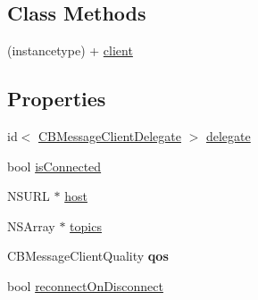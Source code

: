 \subsection*{Class Methods}
\begin{DoxyCompactItemize}
\item 
(instancetype) + \hyperlink{interface_c_b_message_client_acef3f93cc08d62c70a978d81b04d8f6f}{client}
\end{DoxyCompactItemize}
\subsection*{Properties}
\begin{DoxyCompactItemize}
\item 
id$<$ \hyperlink{protocol_c_b_message_client_delegate-p}{C\+B\+Message\+Client\+Delegate} $>$ \hyperlink{interface_c_b_message_client_a6a94ee89f64cbc4bef855ecdda6fbf85}{delegate}
\item 
bool \hyperlink{interface_c_b_message_client_a6a385330b831471122ffb52b101422fb}{is\+Connected}
\item 
N\+S\+U\+R\+L $\ast$ \hyperlink{interface_c_b_message_client_a770ff8d5b798d220ecc7bc00804112d4}{host}
\item 
N\+S\+Array $\ast$ \hyperlink{interface_c_b_message_client_a41081dc92c32ef8aa7ab364463825398}{topics}
\item 
\hypertarget{interface_c_b_message_client_a735d7e8e3ed831a23e3890cecd45e9e8}{C\+B\+Message\+Client\+Quality {\bfseries qos}}\label{interface_c_b_message_client_a735d7e8e3ed831a23e3890cecd45e9e8}

\item 
bool \hyperlink{interface_c_b_message_client_ab7081a5e525a5b45420b1e44e23a90a4}{reconnect\+On\+Disconnect}
\end{DoxyCompactItemize}


